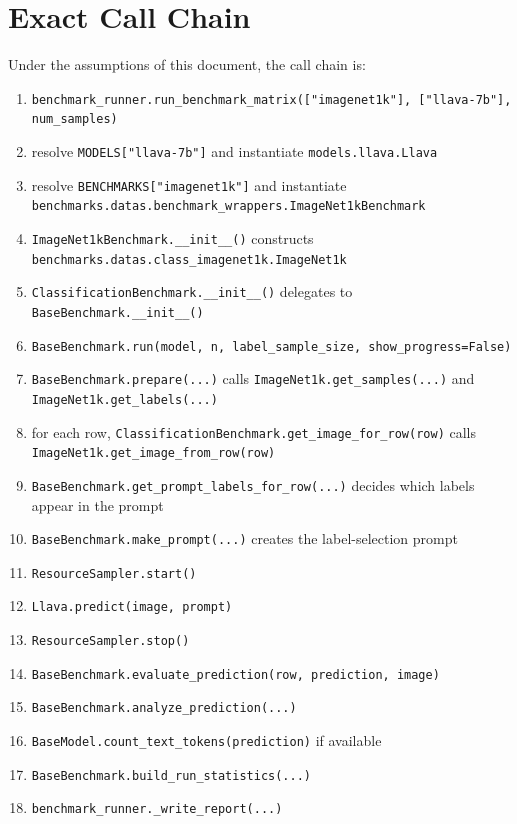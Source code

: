 \documentclass[11pt]{article}
\begin{document}
\section{Exact Call Chain}
Under the assumptions of this document, the call chain is:
\begin{enumerate}[label=\arabic*.]
    \item \texttt{benchmark\_runner.run\_benchmark\_matrix(["imagenet1k"], ["llava-7b"], num\_samples)}
    \item resolve \texttt{MODELS["llava-7b"]} and instantiate \texttt{models.llava.Llava}
    \item resolve \texttt{BENCHMARKS["imagenet1k"]} and instantiate \texttt{benchmarks.datas.benchmark\_wrappers.ImageNet1kBenchmark}
    \item \texttt{ImageNet1kBenchmark.\_\_init\_\_()} constructs \texttt{benchmarks.datas.class\_imagenet1k.ImageNet1k}
    \item \texttt{ClassificationBenchmark.\_\_init\_\_()} delegates to \texttt{BaseBenchmark.\_\_init\_\_()}
    \item \texttt{BaseBenchmark.run(model, n, label\_sample\_size, show\_progress=False)}
    \item \texttt{BaseBenchmark.prepare(...)} calls \texttt{ImageNet1k.get\_samples(...)} and \texttt{ImageNet1k.get\_labels(...)}
    \item for each row, \texttt{ClassificationBenchmark.get\_image\_for\_row(row)} calls \texttt{ImageNet1k.get\_image\_from\_row(row)}
    \item \texttt{BaseBenchmark.get\_prompt\_labels\_for\_row(...)} decides which labels appear in the prompt
    \item \texttt{BaseBenchmark.make\_prompt(...)} creates the label-selection prompt
    \item \texttt{ResourceSampler.start()}
    \item \texttt{Llava.predict(image, prompt)}
    \item \texttt{ResourceSampler.stop()}
    \item \texttt{BaseBenchmark.evaluate\_prediction(row, prediction, image)}
    \item \texttt{BaseBenchmark.analyze\_prediction(...)}
    \item \texttt{BaseModel.count\_text\_tokens(prediction)} if available
    \item \texttt{BaseBenchmark.build\_run\_statistics(...)}
    \item \texttt{benchmark\_runner.\_write\_report(...)}
\end{enumerate}
\end{document}
